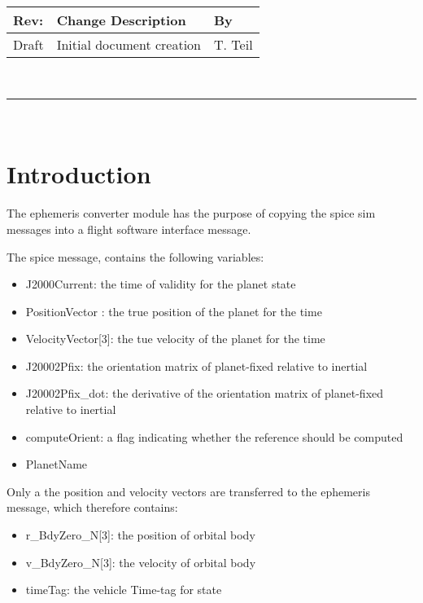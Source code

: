 \documentclass[]{BasiliskReportMemo}
\begin{document}
\makeCover
%
%
\pagestyle{empty}
{\renewcommand{\arraystretch}{1.1}
\noindent
\begin{longtable}{|p{0.5in}|p{4.5in}|p{1.14in}|}
\hline
{\bfseries Rev}: & {\bfseries Change Description} & {\bfseries By} \\
\hline
Draft & Initial document creation & T. Teil \\
\hline

\end{longtable}
}

\newpage
\setcounter{page}{1}
\pagestyle{fancy}

\tableofcontents
~\\ \hrule ~\\



\section{Introduction}

The ephemeris converter module has the purpose of copying the spice sim messages into a flight software interface message. 

The spice message, contains the following variables:

\begin{itemize}
\item J2000Current: the time of validity for the planet state
\item PositionVector : the true position of the planet for the time
    \item  VelocityVector[3]: the tue velocity of the planet for the time
    \item  J20002Pfix: the orientation matrix of planet-fixed relative to inertial
    \item  J20002Pfix\_dot: the derivative of the orientation matrix of planet-fixed relative to inertial
    \item  computeOrient: a flag indicating whether the reference should be computed
    \item  PlanetName
\end{itemize}

Only a the position and velocity vectors are transferred to the ephemeris message, which therefore contains:
\begin{itemize}
    \item r\_BdyZero\_N[3]: the position of orbital body 
    \item v\_BdyZero\_N[3]: the velocity of orbital body
    \item timeTag: the vehicle Time-tag for state
\end{itemize}
\end{document}
